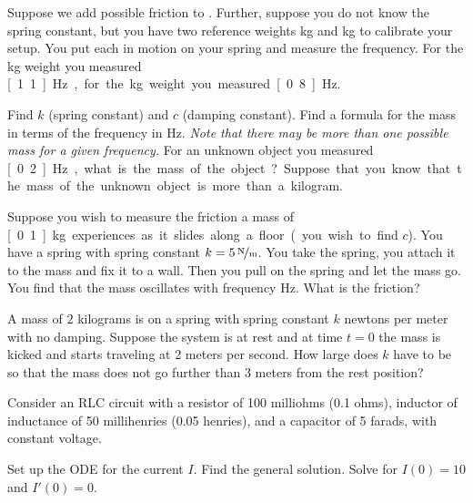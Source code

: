 \begin{exercise}
Suppose we add possible friction to .
Further, suppose you do not know the spring constant, but you have
two reference weights \unit[1]{kg} and \unit[2]{kg} to calibrate your setup.
You put each in motion on your spring and measure the
frequency.  For the \unit[1]{kg}
weight you measured \unit[1.1]{Hz}, for the \unit[2]{kg} weight you
measured \unit[0.8]{Hz}.
\begin{tasks}
\task Find $k$ (spring constant) and $c$ (damping constant).
\task Find a formula for the mass in terms of the frequency in Hz.  \emph{Note that
there may be more than one possible mass for a given frequency.}
\task For an unknown object you measured \unit[0.2]{Hz}, what is the mass of the
object?  Suppose that you know that the mass of the unknown object
is more than a kilogram.
\end{tasks}
\end{exercise}

\begin{exercise}
Suppose you wish to measure the friction a mass of \unit[0.1]{kg} experiences
as it slides along a floor (you wish to find $c$).  You have a spring with
spring constant $k=\unitfrac[5]{N}{m}$.  You take the spring, you attach it
to the mass and fix it to a wall.  Then you pull on the spring and let the
mass go.  You find that the mass oscillates with frequency \unit[1]{Hz}.
What is the friction?
\end{exercise}

\setcounter{exercise}{100}

\begin{exercise}
A mass of $2$ kilograms is on a spring with spring constant $k$ newtons per
meter with no damping.  Suppose the system is at rest and at time $t=0$ the
mass is kicked and starts traveling at 2 meters per second.  How large
does $k$ have to be so that the mass does not go further than 3 meters
from the rest position?
\end{exercise}

\begin{exercise}
Consider an RLC circuit with a resistor of 100 milliohms (0.1 ohms),
inductor of inductance of 50 millihenries (0.05 henries), and a capacitor of 5 farads, with
constant voltage.
\begin{tasks}
\task Set up the ODE for the current $I$.
\task Find the general solution.
\task Solve for $I(0) = 10$ and $I'(0) = 0$.
\end{tasks}
\end{exercise}

